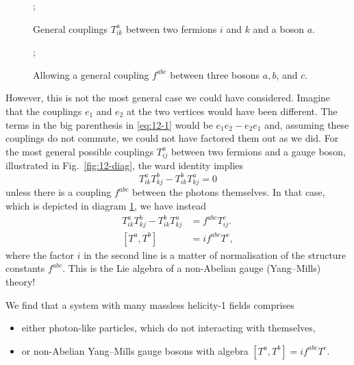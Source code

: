 \begin{figure}[tbhp]
  \centering
  \begin{minipage}[t]{0.45\columnwidth}
    \centering
      ;
    \caption{General couplings $T^{a}_{ik}$ between two fermions $i$ and $k$ and a boson $a$.}
    \label{fig:12-diag}
  \end{minipage}%
  \qquad
  \begin{minipage}[t]{0.45\columnwidth}
    \centering
    ;
    \caption{Allowing a general coupling $f^{abc}$ between three bosons $a, b$, and $c$.}
    \label{fig:12-diag2}
  \end{minipage}
\end{figure}

However, this is not the most general case we could have considered. Imagine that the couplings $e_1$ and $e_2$ at the two vertices would have been different. The terms in the big parenthesis in \eqref{eq:12-1} would be $e_1 e_2 - e_2 e_1$ and, assuming these couplings do not commute, we could not have factored them out as we did. For the most general possible couplings $T^a_{ij}$ between two fermions and a gauge boson, illustrated in Fig.~\ref{fig:12-diag}, the ward identity implies
\begin{equation}
  T^a_{ik} T^{b}_{kj} - T^b_{ik} T^a_{kj}  = 0
\end{equation}
unless there is a coupling $f^{abc}$ between the photons themselves.
In that case, which is depicted in diagram \ref{fig:12-diag2}, we have instead
\begin{align}
  T_{ik}^a T^b_{kj} - T^b_{ik} T^a_{kj} &= f^{abc} T^c_{ij}. \\
  [T^a, T^b] &= i f^{abc} T^c,
\end{align}
where the factor $i$ in the second line is a matter of normalisation of the structure constants $f^{abc}$.
This is the Lie algebra of a non-Abelian gauge (Yang--Mills) theory!

We find that a system with many massless helicity-1 fields comprises
\begin{itemize}
  \item either photon-like particles, which do not interacting with themselves, 
  \item or non-Abelian Yang--Mills gauge bosons with algebra $[T^a, T^b] = i f^{abc} T^c$.
\end{itemize}

